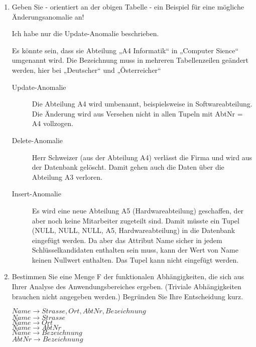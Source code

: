 \documentclass{lehramt-informatik-haupt}
\begin{document}
\renewcommand{\labelenumi}{(\alph{enumi})}
\begin{enumerate}


\item Geben Sie - orientiert an der obigen Tabelle - ein Beispiel für
eine mögliche Änderungsanomalie an!

Ich habe nur die Update-Anomalie beschrieben.

\begin{antwort}[falsch]
Es könnte sein, dass sie Abteilung „A4 Informatik“ in „Computer Sience“
umgenannt wird. Die Bezeichnung muss in mehreren Tabellenzeilen
geändert werden, hier bei „Deutscher“ und „Österreicher“
\end{antwort}

\begin{antwort}
\begin{description}
\item[Update-Anomalie] Die Abteilung A4 wird umbenannt, beispielsweise
in Softwareabteilung. Die Änderung wird aus Versehen nicht in allen
Tupeln mit AbtNr = A4 vollzogen.

\item[Delete-Anomalie] Herr Schweizer (aus der Abteilung A4) verlässt
die Firma und wird aus der Datenbank gelöscht. Damit gehen auch die
Daten über die Abteilung A3 verloren.

\item[Insert-Anomalie] Es wird eine neue Abteilung A5
(Hardwareabteilung) geschaffen, der aber noch keine Mitarbeiter
zugeteilt sind. Damit müsste ein Tupel (NULL, NULL, NULL, A5,
Hardwareabteilung) in die Datenbank eingefügt werden. Da aber das
Attribut Name sicher in jedem Schlüsselkandidaten enthalten sein muss,
kann der Wert von Name keinen Nullwert enthalten. Das Tupel kann nicht
eingefügt werden.
\end{description}
\end{antwort}


\item Bestimmen Sie eine Menge F der funktionalen Abhängigkeiten, die
sich aus Ihrer Analyse des Anwendungsbereiches ergeben. (Triviale
Abhängigkeiten brauchen nicht angegeben werden.) Begründen Sie Ihre
Entscheidung kurz.

\begin{antwort}[falsch]
$Name \rightarrow Strasse, Ort, AbtNr, Bezeichnung$ \\
$Name \rightarrow Strasse$ \\
$Name \rightarrow Ort$ \\
$Name \rightarrow AbtNr$ \\
$Name \rightarrow Bezeichnung$ \\
$AbtNr \rightarrow Bezeichnung$
\end{antwort}


\end{enumerate}
\end{document}
